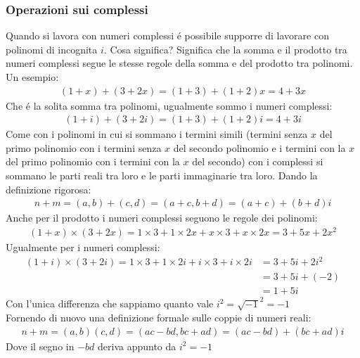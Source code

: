 \documentclass[twoside]{article} %
\begin{document}
	 \subsubsection{Operazioni sui complessi}
	 Quando si lavora con numeri complessi \'e possibile supporre di lavorare con polinomi di incognita $i$. Cosa significa? Significa che la somma e il prodotto tra numeri complessi segue le stesse regole della somma e del prodotto tra polinomi. Un esempio:
	 \begin{gather*}
	 	(1+x)+(3+2x)=(1+3)+(1+2)x=4+3x
	 \end{gather*}
	 Che \'e la solita somma tra polinomi, ugualmente sommo i numeri complessi:
	 \begin{gather*}
	 	(1+i)+(3+2i)=(1+3)+(1+2)i=4+3i
	 \end{gather*}
	 Come con i polinomi in cui si sommano i termini simili (termini senza $x$ del primo polinomio con i termini senza $x$ del secondo polinomio e i termini con la $x$ del primo polinomio con i termini con la $x$ del secondo) con i complessi si sommano le parti reali tra loro e le parti immaginarie tra loro. Dando la definizione rigorosa:
	 \begin{gather*}
	 	n+m= (a,b)+(c,d)=(a+c,b+d)= (a+c)+(b+d)i
	 \end{gather*}
	 Anche per il prodotto i numeri complessi seguono le regole dei polinomi:
	 \begin{gather*}
	 	(1+x)\times(3+2x)=1\times 3+1\times 2x+x\times 3+x\times 2x=3+5x+2x^2
	 \end{gather*}
	 Ugualmente per i numeri complessi:
	\begin{align*}
	 	(1+i)\times(3+2i)=1\times 3+1\times 2i+i\times 3+i\times 2i&=3+5i+2i^2\\
	 	&=3+5i+(-2)\\
	 	&=1+5i
	 \end{align*}
	 Con l'unica differenza che sappiamo quanto vale $i^2=\sqrt{-1}^2=-1$\\
	 Fornendo di nuovo una definizione formale sulle coppie di numeri reali:
	 \begin{gather*}
	 	n+m= (a,b)(c,d)=(ac-bd,bc+ad)= (ac-bd)+(bc+ad)i
	 \end{gather*}
	 Dove il segno in $-bd$ deriva appunto da $i^2=-1$
	 
	 \newpage
\end{document}
